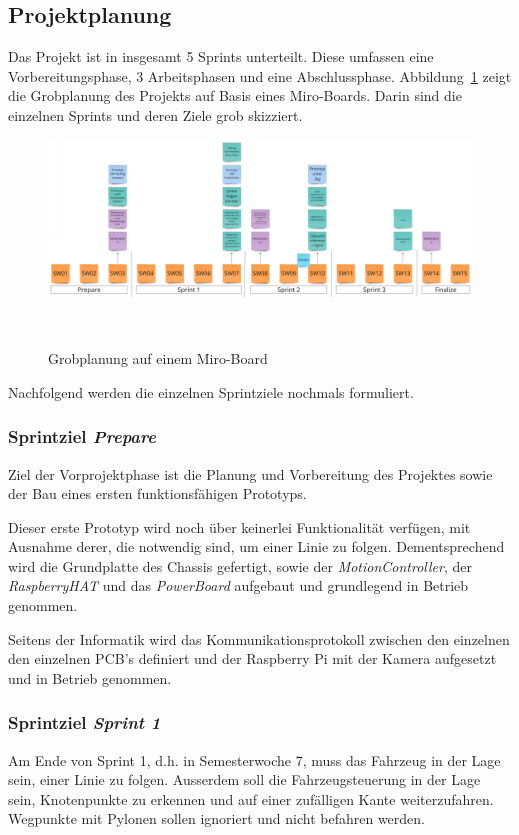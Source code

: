 \documentclass[main.tex]{subfiles} %
\begin{document}

\subsection{Projektplanung}

Das Projekt ist in insgesamt 5 Sprints unterteilt. Diese umfassen eine
Vorbereitungsphase, 3 Arbeitsphasen und eine Abschlussphase.
Abbildung~\ref{fig:Grobplanung} zeigt die Grobplanung des Projekts auf Basis
eines Miro-Boards. Darin sind die einzelnen Sprints und deren Ziele grob
skizziert.

\begin{figure}[h]
    \centering
    \includegraphics[width=1\textwidth]{./fig_Projektmanagement/Grobplanung_MiroBoard.png}
    \caption{Grobplanung auf einem Miro-Board}~\label{fig:Grobplanung}
\end{figure}

Nachfolgend werden die einzelnen Sprintziele nochmals formuliert.

\subsubsection*{Sprintziel \textit{Prepare}}
Ziel der Vorprojektphase ist die Planung und Vorbereitung des Projektes sowie
der Bau eines ersten funktionsfähigen Prototyps.

Dieser erste Prototyp wird noch über keinerlei Funktionalität verfügen, mit
Ausnahme derer, die notwendig sind, um einer Linie zu folgen. Dementsprechend
wird die Grundplatte des Chassis gefertigt, sowie der
\textit{MotionController}, der \textit{RaspberryHAT} und das
\textit{PowerBoard} aufgebaut und grundlegend in Betrieb genommen.

Seitens der Informatik wird das Kommunikationsprotokoll zwischen den einzelnen
den einzelnen PCB's definiert und der Raspberry Pi mit der Kamera aufgesetzt
und in Betrieb genommen.

\subsubsection*{Sprintziel \textit{Sprint 1}}
Am Ende von Sprint 1, d.h. in Semesterwoche 7, muss das Fahrzeug in der Lage sein,
einer Linie zu folgen. Ausserdem soll die Fahrzeugsteuerung in der Lage sein,
Knotenpunkte zu erkennen und auf einer zufälligen Kante weiterzufahren. Wegpunkte
mit Pylonen sollen ignoriert und nicht befahren werden.
\end{document}
